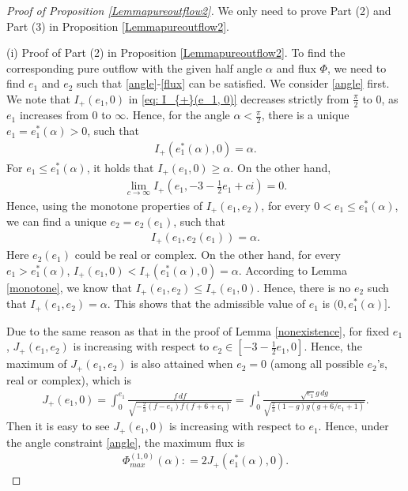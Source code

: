 \documentclass[reqno,12pt]{amsart}
\begin{document}
\begin{proof} [Proof of Proposition \ref{Lemmapureoutflow2}]
We only need to prove  Part (2) and  Part (3) in Proposition \ref{Lemmapureoutflow2}.

(i) Proof of Part (2) in Proposition \ref{Lemmapureoutflow2}.
To find the corresponding pure outflow with the given half angle $\alpha$ and flux $\Phi$, we need to find $e_1$ and $e_2$ such that \eqref{angle}-\eqref{flux} can be satisfied. We consider  \eqref{angle} first.
We note that $I_{+}(e_1, 0)$ in \eqref{eq: I_{+}(e_1, 0)} decreases strictly from $\frac{\pi}{2}$ to $0$, as $e_1$ increases from $0$ to $\infty$. Hence, for the angle $\alpha< \frac{\pi}{2}$, there is a unique $e_1= e_1^*(\alpha) >0 $, such that 
\begin{align}\label{angle-10}
    I_{+}(e_1^*(\alpha), 0) = \alpha. 
\end{align}
For $e_1 \leq e_1^*(\alpha)$, it holds that $I_{+}(e_1, 0) \geq \alpha $. On the other hand, 
\begin{align}\nonumber 
    \lim_{c\to \infty} I_{+} \left(e_1, -3- \frac12 e_1 + ci\right) =0. 
\end{align}
Hence, using the monotone properties of $I_{+}(e_1, e_2)$, for every $0<e_1 \leq e_1^*(\alpha)$, we can find a unique $e_2=e_2(e_1)$, such that 
\begin{align*}
    I_{+}(e_1, e_2(e_1)) = \alpha. 
\end{align*}
Here $e_2(e_1)$ could be real or complex. 
On the other hand, for every $e_1 > e_1^*(\alpha)$, $I_{+}(e_1, 0) < I_{+}(e_1^*(\alpha), 0)=\alpha$. According to Lemma \ref{monotone}, we know that 
 $I_{+}(e_1, e_2) \leq I_{+}(e_1, 0)$. Hence, 
there is no $e_2$ such that $I_{+}(e_1, e_2)=\alpha$.
This shows that the admissible value of $e_1$ is $(0,e_1^*(\alpha)]$.


Due to the same reason as that in the proof of Lemma \ref{nonexistence},  for fixed $e_1$, $J_{+}(e_1, e_2)$ is increasing with respect to $e_2\in [-3- \frac12 e_1,0]$. Hence,
the maximum of $J_{+}(e_1, e_2)$ is also attained when $e_2 = 0$ (among all possible $e_2$'s, real or complex), which is 
\begin{align*}
    J_{+}(e_1, 0) = \int_0^{e_1} \frac{f\, df }{\sqrt{-\frac23 (f - e_1) f (f+ 6 + e_1)}}  = \int_0^1 \frac{\sqrt{e_1} g \, dg }{\sqrt{\frac23(1-g) g (g+ 6/e_1 + 1)}} .
\end{align*}
Then it is easy to see $J_{+}(e_1, 0)$ is increasing with respect to $e_1$. Hence, under the angle constraint \eqref{angle}, the maximum  flux is 
\begin{align}\label{eq:maxifluxpureout} 
    \Phi_{max}^{(1, 0)}(\alpha) : =2 J_{+}(e_1^*(\alpha), 0).
\end{align}


\end{proof}
\end{document}
